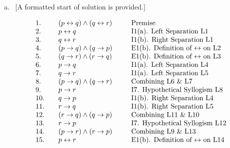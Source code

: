 \documentclass[12pt]{article}
\begin{document}
	\begin{enumerate}[(a)]
		\item \  [A formatted start of solution is provided.]

			\[
				\begin{array}{lclcl}
					1.  &  & (p \leftrightarrow q) \wedge (q \leftrightarrow r) & \hspace*{.1in} & \mbox{Premise}                                       \\
					2.  &  & p \leftrightarrow q                                &                & \mbox{I1(a). Left Separation L1}                     \\
					3.  &  & q \leftrightarrow r                                &                & \mbox{I1(b). Right Separation L1}                    \\
					4.  &  & (p \rightarrow q) \wedge (q \rightarrow p)         &                & \mbox{E1(b). Definition of $\leftrightarrow$ on L2}  \\
					5.  &  & (q \rightarrow r) \wedge (r \rightarrow q)         &                & \mbox{E1(b). Definition of $\leftrightarrow$ on L3}  \\
					6.  &  & p \rightarrow q                                    &                & \mbox{I1(a). Left Separation L4}                     \\
					7.  &  & q \rightarrow r                                    &                & \mbox{I1(a). Left Separation L5}                     \\
					8.  &  & (p \rightarrow q) \wedge (q \rightarrow r)         &                & \mbox{Combining L6 \& L7}                            \\
					9.  &  & p \rightarrow r                                    &                & \mbox{I7. Hypothetical Syllogism L8}                 \\
					10. &  & q \rightarrow p                                    &                & \mbox{I1(b). Right Separation L4}                    \\
					11. &  & r \rightarrow q                                    &                & \mbox{I1(b). Right Separation L5}                    \\
					12. &  & (r \rightarrow q) \wedge (q \rightarrow p)         &                & \mbox{Combining L11 \& L10}                          \\
					13. &  & r \rightarrow p                                    &                & \mbox{I7. Hypothetical Syllogism L12}                \\
					14. &  & (p \rightarrow r) \wedge (r \rightarrow p)         &                & \mbox{Combining L9 \& L13}                           \\
					15. &  & p \leftrightarrow r                                &                & \mbox{E1(b). Definition of $\leftrightarrow$ on L14}
				\end{array}
			\]


\end{enumerate}
\end{document}
